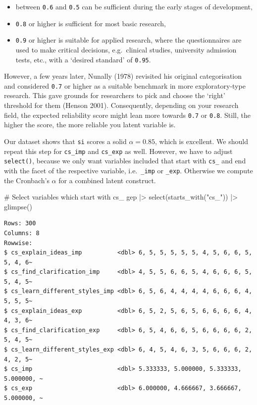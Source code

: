 \documentclass[
  letterpaper,
]{krantz}
\makeatletter
\newenvironment{Shaded}{\begin{snugshade}}{\end{snugshade}}
\newcommand{\CommentTok}[1]{\textcolor[rgb]{0.37,0.37,0.37}{#1}}
\newcommand{\FunctionTok}[1]{\textcolor[rgb]{0.28,0.35,0.67}{#1}}
\newcommand{\NormalTok}[1]{\textcolor[rgb]{0.00,0.23,0.31}{#1}}
\newcommand{\SpecialCharTok}[1]{\textcolor[rgb]{0.37,0.37,0.37}{#1}}
\newcommand{\StringTok}[1]{\textcolor[rgb]{0.13,0.47,0.30}{#1}}
\newenvironment{kframe}{%
\medskip{}
\setlength{\fboxsep}{.8em}
 \def\at@end@of@kframe{}%
 \ifinner\ifhmode%
  \def\at@end@of@kframe{\end{minipage}}%
  \begin{minipage}{\columnwidth}%
 \fi\fi%
 \def\FrameCommand##1{\hskip\@totalleftmargin \hskip-\fboxsep
 \colorbox{shadecolor}{##1}\hskip-\fboxsep
     \hskip-\linewidth \hskip-\@totalleftmargin \hskip\columnwidth}%
 \MakeFramed {\advance\hsize-\width
   \@totalleftmargin\z@ \linewidth\hsize
   \@setminipage}}%
 {\par\unskip\endMakeFramed%
 \at@end@of@kframe}
\renewenvironment{Shaded}{\begin{kframe}}{\end{kframe}}
\makeatother
\begin{document}
\begin{itemize}
\item
  between \texttt{0.6} and \texttt{0.5} can be sufficient during the
  early stages of development,
\item
  \texttt{0.8} or higher is sufficient for most basic research,
\item
  \texttt{0.9} or higher is suitable for applied research, where the
  questionnaires are used to make critical decisions, e.g.~clinical
  studies, university admission tests, etc., with a `desired standard'
  of \texttt{0.95}.
\end{itemize}

However, a few years later, Nunally (1978) revisited his original
categorisation and considered \texttt{0.7} or higher as a suitable
benchmark in more exploratory-type research. This gave grounds for
researchers to pick and choose the `right' threshold for them (Henson
2001). Consequently, depending on your research field, the expected
reliability score might lean more towards \texttt{0.7} or \texttt{0.8}.
Still, the higher the score, the more reliable you latent variable is.

Our dataset shows that \texttt{si} scores a solid \(\alpha = 0.85\),
which is excellent. We should repeat this step for \texttt{cs\_imp} and
\texttt{cs\_exp} as well. However, we have to adjust \texttt{select()},
because we only want variables included that start with \texttt{cs\_}
and end with the facet of the respective variable, i.e.~\texttt{\_imp}
or \texttt{\_exp}. Otherwise we compute the Cronbach's \(\alpha\) for a
combined latent construct.

\begin{Shaded}
\begin{Highlighting}[]
\CommentTok{\# Select variables which start with \textquotesingle{}cs\_\textquotesingle{}}
\NormalTok{gep }\SpecialCharTok{|\textgreater{}}
  \FunctionTok{select}\NormalTok{(}\FunctionTok{starts\_with}\NormalTok{(}\StringTok{"cs\_"}\NormalTok{)) }\SpecialCharTok{|\textgreater{}}
  \FunctionTok{glimpse}\NormalTok{()}
\end{Highlighting}
\end{Shaded}

\begin{verbatim}
Rows: 300
Columns: 8
Rowwise: 
$ cs_explain_ideas_imp          <dbl> 6, 5, 5, 5, 5, 5, 4, 5, 6, 6, 5, 5, 4, 6~
$ cs_find_clarification_imp     <dbl> 4, 5, 5, 6, 6, 5, 4, 6, 6, 6, 5, 5, 4, 5~
$ cs_learn_different_styles_imp <dbl> 6, 5, 6, 4, 4, 4, 4, 6, 6, 6, 4, 5, 5, 5~
$ cs_explain_ideas_exp          <dbl> 6, 5, 2, 5, 6, 5, 6, 6, 6, 6, 4, 4, 3, 6~
$ cs_find_clarification_exp     <dbl> 6, 5, 4, 6, 6, 5, 6, 6, 6, 6, 2, 5, 4, 5~
$ cs_learn_different_styles_exp <dbl> 6, 4, 5, 4, 6, 3, 5, 6, 6, 6, 2, 4, 2, 5~
$ cs_imp                        <dbl> 5.333333, 5.000000, 5.333333, 5.000000, ~
$ cs_exp                        <dbl> 6.000000, 4.666667, 3.666667, 5.000000, ~
\end{verbatim}
\end{document}
